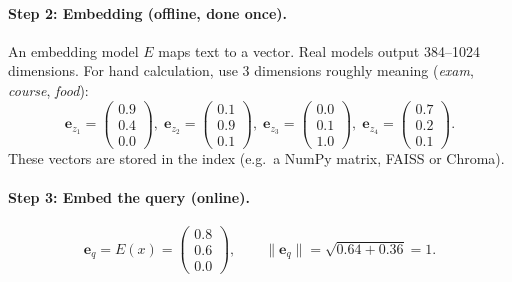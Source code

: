 \documentclass[11pt]{article}
\begin{document}
\paragraph{Step 2: Embedding (offline, done once).}
An embedding model $E$ maps text to a vector. Real models output 384--1024 dimensions. For hand calculation, use 3 dimensions roughly meaning (\textit{exam}, \textit{course}, \textit{food}):
\begin{equation}
  \mathbf{e}_{z_1} = \begin{pmatrix}0.9\\0.4\\0.0\end{pmatrix},\;
  \mathbf{e}_{z_2} = \begin{pmatrix}0.1\\0.9\\0.1\end{pmatrix},\;
  \mathbf{e}_{z_3} = \begin{pmatrix}0.0\\0.1\\1.0\end{pmatrix},\;
  \mathbf{e}_{z_4} = \begin{pmatrix}0.7\\0.2\\0.1\end{pmatrix}.
\end{equation}
These vectors are stored in the index (e.g.\ a NumPy matrix, FAISS or Chroma).

\paragraph{Step 3: Embed the query (online).}
\begin{equation}
  \mathbf{e}_q = E(x) = \begin{pmatrix}0.8\\0.6\\0.0\end{pmatrix}, \qquad \lVert \mathbf{e}_q \rVert = \sqrt{0.64 + 0.36} = 1.
\end{equation}
\end{document}
